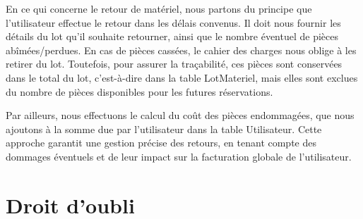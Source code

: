 En ce qui concerne le retour de matériel, nous partons du principe que l'utilisateur effectue le retour dans les délais convenus. Il doit nous fournir les détails du lot qu'il souhaite retourner, ainsi que le nombre éventuel de pièces abîmées/perdues. En cas de pièces cassées, le cahier des charges nous oblige à les retirer du lot. Toutefois, pour assurer la traçabilité, ces pièces sont conservées dans le total du lot, c'est-à-dire dans la table LotMateriel, mais elles sont exclues du nombre de pièces disponibles pour les futures réservations.

Par ailleurs, nous effectuons le calcul du coût des pièces endommagées, que nous ajoutons à la somme due par l'utilisateur dans la table Utilisateur. Cette approche garantit une gestion précise des retours, en tenant compte des dommages éventuels et de leur impact sur la facturation globale de l'utilisateur.


\section{Droit d'oubli}




